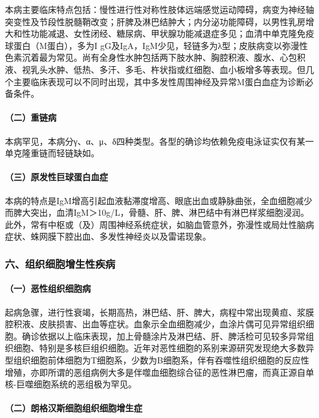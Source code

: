本病主要临床特点包括：慢性进行性对称性肢体远端感觉运动障碍，病变为神经轴突变性及节段性脱髓鞘改变；肝脾及淋巴结肿大；内分泌功能障碍，以男性乳房增大和性功能减退、女性闭经、糖尿病、甲状腺功能减退症多见；血清中单克隆免疫球蛋白（M蛋白），多为I
gG及IgA，IgM少见，轻链多为λ型；皮肤病变以弥漫性色素沉着最为常见。尚有全身性水肿包括两下肢水肿、胸腔积液、腹水、心包积液、视乳头水肿、低热、多汗、多毛、杵状指或红细胞、血小板增多等表现。但几个主要临床表现可以不同时出现，其中多发性周围神经及异常M蛋白血症为诊断必备条件。

\paragraph{（二）重链病}

本病罕见，本病分γ、α、μ、δ四种类型。各型的确诊均依赖免疫电泳证实仅有某一单克隆重链而轻链缺如。

\paragraph{（三）原发性巨球蛋白血症}

本病的特点是IgM增高引起血液黏滞度增高、眼底出血或静脉曲张，全血细胞减少而脾大突出，血清IgM＞10g/L，骨髓、肝、脾、淋巴结中有淋巴样浆细胞浸润。此外，常有中枢或（及）周围神经系统症状，如脑血管意外，弥漫性或局灶性脑病症状、蛛网膜下腔出血、多发性神经炎以及雷诺现象。

\subsubsection{六、组织细胞增生性疾病}

\paragraph{（一）恶性组织细胞病}

起病急骤，进行性衰竭，长期高热，淋巴结、肝、脾大，病程中常出现黄疸、浆膜腔积液、皮肤损害、出血等症状。血象示全血细胞减少，血涂片偶可见异常组织细胞。确诊依据以上临床表现，加上骨髓涂片及淋巴结、肝、脾活检可见较多异常组织细胞、特别是多核巨组织细胞。近年对恶性细胞的系别来源研究发现绝大多数异型组织细胞前体细胞为T细胞系，少数为B细胞系，伴有吞噬性组织细胞的反应性增殖，亦即所谓的恶组病例大多是伴噬血细胞综合征的恶性淋巴瘤，而真正源自单核-巨噬细胞系统的恶组极为罕见。

\paragraph{（二）朗格汉斯细胞组织细胞增生症}


